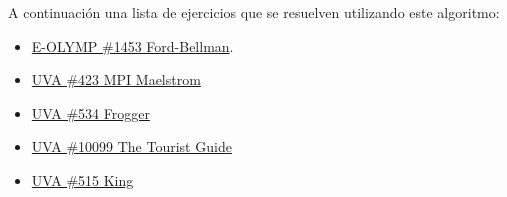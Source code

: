 A continuación una lista de ejercicios que se resuelven utilizando este algoritmo:

\begin{itemize}
	\item \href{https://www.e-olymp.com/en/problems/1453} {E-OLYMP \#1453 Ford-Bellman}.
	\item \href{http://uva.onlinejudge.org/index.php?option=com\_onlinejudge\&Itemid=8\&page=show\_problem\&problem=364}
	       {UVA \#423 MPI Maelstrom}
	\item \href{http://uva.onlinejudge.org/index.php?option=com\_onlinejudge\&Itemid=8\&category=7\&page=show\_problem\&problem=475} 
		   {UVA \#534 Frogger}
	\item \href{http://uva.onlinejudge.org/index.php?option=com\_onlinejudge\&Itemid=8\&category=12\&page=show\_problem\&problem=1040}
	       {UVA \#10099 The Tourist Guide }
	\item \href{http://uva.onlinejudge.org/index.php?option=onlinejudge\&page=show\_problem\&problem=456}
	       {UVA \#515 King }
\end{itemize}